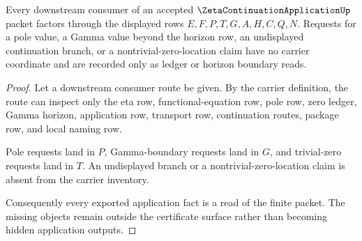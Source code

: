 \begin{theorem}
\label{thm:zeta-continuation-application-non-escape}
Every downstream consumer of an accepted $\ZetaContinuationApplicationUp$ packet factors through the displayed rows $E,F,P,T,G,A,H,C,Q,N$. Requests for a pole value, a Gamma value beyond the horizon row, an undisplayed continuation branch, or a nontrivial-zero-location claim have no carrier coordinate and are recorded only as ledger or horizon boundary reads.
\end{theorem}
\begin{proof}
Let a downstream consumer route be given. By the carrier definition, the route can inspect only the eta row, functional-equation row, pole row, zero ledger, Gamma horizon, application row, transport row, continuation routes, package row, and local naming row.

Pole requests land in $P$, Gamma-boundary requests land in $G$, and trivial-zero requests land in $T$. An undisplayed branch or a nontrivial-zero-location claim is absent from the carrier inventory.

Consequently every exported application fact is a read of the finite packet. The missing objects remain outside the certificate surface rather than becoming hidden application outputs.
\end{proof}

